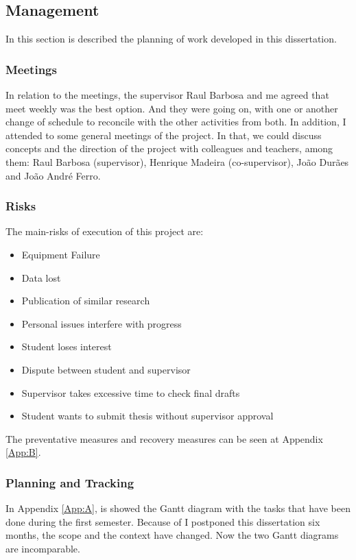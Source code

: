 \subsection{Management}

In this section is described the planning of work developed in this dissertation.

\subsubsection{Meetings}
In relation to the meetings, the supervisor Raul Barbosa and me agreed that meet weekly was the best option. And they were going on, with one or another change of schedule to reconcile with the other activities from both. In addition, I attended to some general meetings of the project. In that, we could discuss concepts and the direction of the project with colleagues and teachers, among them: Raul Barbosa (supervisor), Henrique Madeira (co-supervisor), João Durães and João André Ferro.

\subsubsection{Risks}

The main-risks of execution of this project are:


\begin{itemize}
	\item Equipment Failure
	\item Data lost
	\item Publication of similar research
	\item Personal issues interfere with progress
	\item Student loses interest
	\item Dispute between student and supervisor
	\item Supervisor takes excessive time to check final drafts
	\item Student wants to submit thesis without supervisor approval
\end{itemize}


The preventative measures and recovery measures can be seen at Appendix \ref{App:B}.

\subsubsection{Planning and Tracking}
In Appendix \ref{App:A}, is showed the Gantt diagram with the tasks that have been done during the first semester.
Because of I postponed this dissertation six months, the scope and the context have changed. Now the two Gantt diagrams are incomparable.


